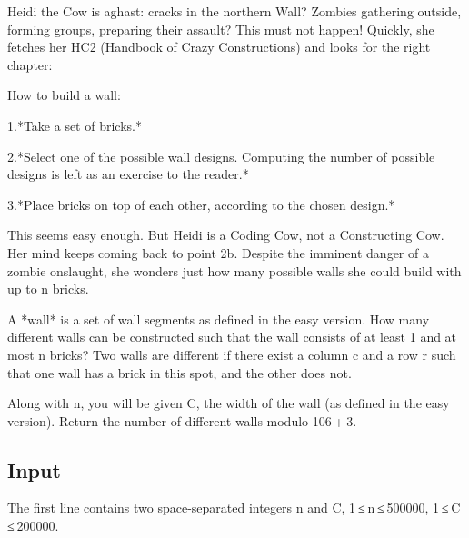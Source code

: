 \documentclass{article}
\begin{document}
    \begin{flushleft}
        Heidi the Cow is aghast: cracks in the northern Wall? Zombies gathering outside, forming groups, preparing their assault? This must not happen! Quickly, she fetches her HC2 (Handbook of Crazy Constructions) and looks for the right chapter:
    \end{flushleft}
    \begin{flushleft}
        How to build a wall:
    \end{flushleft}
    \begin{flushleft}
        1.*Take a set of bricks.*
    \end{flushleft}
    \begin{flushleft}
        2.*Select one of the possible wall designs. Computing the number of possible designs is left as an exercise to the reader.*
    \end{flushleft}
    \begin{flushleft}
        3.*Place bricks on top of each other, according to the chosen design.*
    \end{flushleft}
    \begin{flushleft}
        This seems easy enough. But Heidi is a Coding Cow, not a Constructing Cow. Her mind keeps coming back to point 2b. Despite the imminent danger of a zombie onslaught, she wonders just how many possible walls she could build with up to n bricks.
    \end{flushleft}
    \begin{flushleft}
        A *wall* is a set of wall segments as defined in the easy version. How many different walls can be constructed such that the wall consists of at least 1 and at most n bricks? Two walls are different if there exist a column c and a row r such that one wall has a brick in this spot, and the other does not.
    \end{flushleft}

    \begin{flushleft}
        Along with n, you will be given C, the width of the wall (as defined in the easy version). Return the number of different walls modulo 106 + 3.
    \end{flushleft}


    \subsection*{Input}

    \begin{flushleft}
        The first line contains two space-separated integers n and C, 1 ≤ n ≤ 500000, 1 ≤ C ≤ 200000.
    \end{flushleft}
\end{document}
